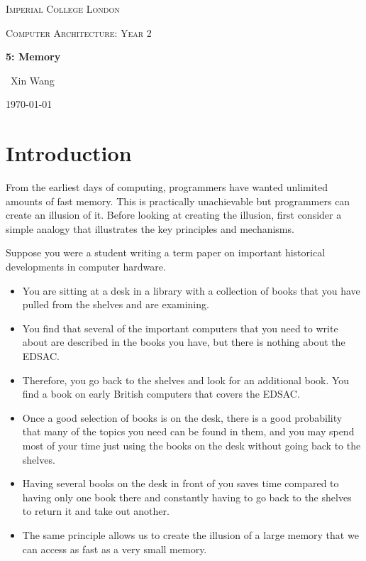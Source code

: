 \documentclass[10pt,a4paper]{article}
\begin{document}

\begin{titlepage}
	\centering
	{\scshape\LARGE Imperial College London \par}
	\vspace{1cm}
    {\scshape\Large Computer Architecture: Year 2\par}
    \vspace{1.5cm}
	{\huge\bfseries 5: Memory \par}
	\vspace{2cm}
	{\Large\ Xin Wang }
	\vfill
	{\large \today\par}
\end{titlepage}


\tableofcontents
\pagebreak

\section{Introduction}

From the earliest days of computing, programmers have wanted unlimited amounts of fast memory. This
is practically unachievable but programmers can create an illusion of it. Before looking at creating
the illusion, first consider a simple analogy that illustrates the key principles and mechanisms.

Suppose you were a student writing a term paper on important historical developments in computer
hardware. 
\begin{itemize}
    \item You are sitting at a desk in a library with a collection of books that you have pulled from the shelves and are examining. 
    \item You find that several of the important computers that you need to write about are described in the books you have, but there is nothing about the EDSAC.
    \item Therefore, you go back to the shelves and look for an additional book. You find a book on early British computers that covers the EDSAC.
    \item Once a good selection of books is on the desk, there is a good probability that many of the topics you need can be found in them, and you may spend most of your time just using the books on the desk without going back to the shelves.
    \item Having several books on the desk in front of you saves time compared to having only one book there and constantly having to go back to the shelves to return it and take out another.
    \item The same principle allows us to create the illusion of a large memory that we can access as fast as a very small memory.
\end{itemize}
\end{document}
